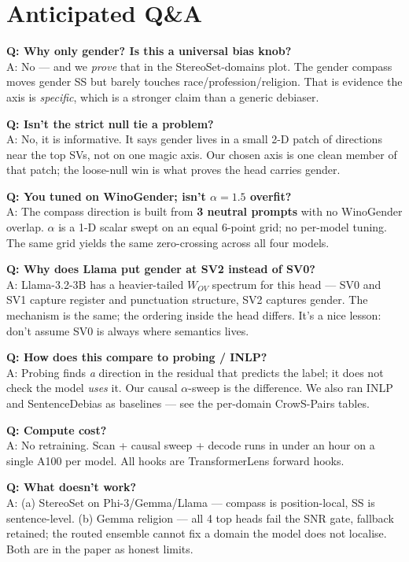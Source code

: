 \documentclass[11pt]{article}
\begin{document}
\section*{Anticipated Q\&A}
\begin{tcolorbox}[qa]
\textbf{Q: Why only gender? Is this a universal bias knob?}\\
A: No --- and we \emph{prove} that in the StereoSet-domains plot. The gender
compass moves gender SS but barely touches race/profession/religion. That
is evidence the axis is \emph{specific}, which is a stronger claim than a
generic debiaser.

\vspace{4pt}
\textbf{Q: Isn't the strict null tie a problem?}\\
A: No, it is informative. It says gender lives in a small 2-D patch of
directions near the top SVs, not on one magic axis. Our chosen axis is one
clean member of that patch; the loose-null win is what proves the head
carries gender.

\vspace{4pt}
\textbf{Q: You tuned on WinoGender; isn't $\alpha{=}1.5$ overfit?}\\
A: The compass direction is built from \textbf{3 neutral prompts} with no
WinoGender overlap. $\alpha$ is a 1-D scalar swept on an equal 6-point grid;
no per-model tuning. The same grid yields the same zero-crossing across all
four models.

\vspace{4pt}
\textbf{Q: Why does Llama put gender at SV2 instead of SV0?}\\
A: Llama-3.2-3B has a heavier-tailed $W_{OV}$ spectrum for this head --- SV0
and SV1 capture register and punctuation structure, SV2 captures gender.
The mechanism is the same; the ordering inside the head differs. It's a
nice lesson: don't assume SV0 is always where semantics lives.

\vspace{4pt}
\textbf{Q: How does this compare to probing / INLP?}\\
A: Probing finds \emph{a} direction in the residual that predicts the
label; it does not check the model \emph{uses} it. Our causal $\alpha$-sweep
is the difference. We also ran INLP and SentenceDebias as baselines --- see
the per-domain CrowS-Pairs tables.

\vspace{4pt}
\textbf{Q: Compute cost?}\\
A: No retraining. Scan + causal sweep + decode runs in under an hour on a
single A100 per model. All hooks are TransformerLens forward hooks.

\vspace{4pt}
\textbf{Q: What doesn't work?}\\
A: (a) StereoSet on Phi-3/Gemma/Llama --- compass is position-local, SS is
sentence-level. (b) Gemma religion --- all 4 top heads fail the SNR gate,
fallback retained; the routed ensemble cannot fix a domain the model does
not localise. Both are in the paper as honest limits.
\end{tcolorbox}
\end{document}
